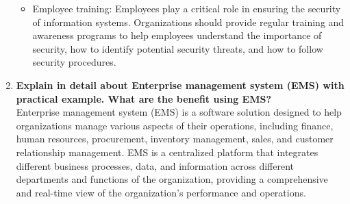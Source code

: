 \documentclass[12pt]{article}
\begin{document}
\begin{enumerate}
\begin{itemize}
        \item Employee training: Employees play a critical role in ensuring the security of information systems. Organizations should provide regular training and awareness programs to help employees understand the importance of security, how to identify potential security threats, and how to follow security procedures.
        \end{itemize}
    \item {\bfseries Explain in detail about Enterprise management system (EMS) with practical example. What are the benefit using EMS?\\}
    Enterprise management system (EMS) is a software solution designed to help organizations manage various aspects of their operations, including finance, human resources, procurement, inventory management, sales, and customer relationship management. EMS is a centralized platform that integrates different business processes, data, and information across different departments and functions of the organization, providing a comprehensive and real-time view of the organization's performance and operations.


\end{enumerate}
\end{document}
